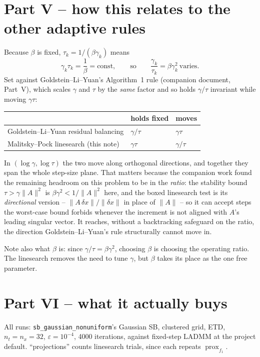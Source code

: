 \documentclass[11pt]{article}
\newcommand{\code}[1]{\texttt{#1}}
\newcommand{\prox}{\operatorname{prox}}
\begin{document}
\section*{Part V -- how this relates to the other adaptive rules}
Because $\beta$ is fixed, $\tau_k=1/(\beta\gamma_k)$ means
\[
\gamma_k\tau_k=\frac1\beta=\text{const},\qquad\text{so}\qquad
\frac{\gamma_k}{\tau_k}=\beta\gamma_k^2\ \text{varies}.
\]
Set against Goldstein--Li--Yuan's Algorithm~1 rule (companion document,
Part~V), which scales $\gamma$ and $\tau$ by the \emph{same} factor and so holds
$\gamma/\tau$ invariant while moving $\gamma\tau$:
\begin{center}
\begin{tabular}{@{}lll@{}}
\toprule
& holds fixed & moves\\
\midrule
Goldstein--Li--Yuan residual balancing & $\gamma/\tau$ & $\gamma\tau$\\
Malitsky--Pock linesearch (this note) & $\gamma\tau$ & $\gamma/\tau$\\
\bottomrule
\end{tabular}
\end{center}
In $(\log\gamma,\log\tau)$ the two move along orthogonal directions, and
together they span the whole step-size plane. That matters because the
companion work found the remaining headroom on this problem to be in the
\emph{ratio}: the stability bound $\tau>\gamma\|A\|^2$ is
$\beta\gamma^2<1/\|A\|^2$ here, and the boxed linesearch test is its
\emph{directional} version -- $\|A\,\delta x\|/\|\delta x\|$ in place of
$\|A\|$ -- so it can accept steps the worst-case bound forbids whenever the
increment is not aligned with $A$'s leading singular vector. It reaches, without
a backtracking safeguard on the ratio, the direction Goldstein--Li--Yuan's rule
structurally cannot move in.

Note also what $\beta$ is: since $\gamma/\tau=\beta\gamma^2$, choosing $\beta$
is choosing the operating ratio. The linesearch removes the need to tune
$\gamma$, but $\beta$ takes its place as the one free parameter.

\section*{Part VI -- what it actually buys}
All runs: \code{sb\_gaussian\_nonuniform}'s Gaussian SB, clustered grid,
ETD, $n_t=n_x=32$, $\varepsilon=10^{-4}$, 4000 iterations, against fixed-step
LADMM at the project default. ``projections'' counts linesearch trials, since
each repeats $\prox_{f_1}$.
\end{document}
